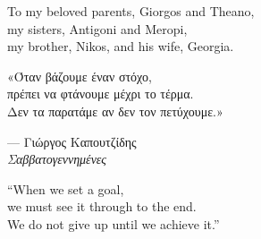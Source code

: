 \cleardoublepage

\pagestyle{plain} \thispagestyle{empty}

\begin{dedication}
	\begin{flushright}
		\small To my beloved parents, Giorgos and Theano,\\ my sisters, Antigoni and Meropi,\\ my brother, Nikos, and his wife, Georgia.
		\normalsize
	\end{flushright}
\end{dedication}

\clearpage


\thispagestyle{empty}

\vspace*{\fill}

\begin{flushright}
	\begin{minipage}{0.85\textwidth} \raggedleft

		\begingroup \selg {}\selectfont \large\itshape

		«Όταν βάζουμε έναν στόχο,\\ πρέπει να φτάνουμε μέχρι το τέρμα.\\ Δεν τα παρατάμε αν δεν τον πετύχουμε.»

		\vspace{1.2em}

		\upshape\normalsize --- Γιώργος Καπουτζίδης\\ \textit{Σαββατογεννημένες} \par \endgroup

		\vspace{2.5\baselineskip}

		\small\itshape

		``When we set a goal,\\ we must see it through to the end.\\ We do not give up until we achieve it.''

	\end{minipage}
\end{flushright}

\vspace*{\fill}

\clearpage

\newpage \pagestyle{empty} \mbox{} \clearpage



